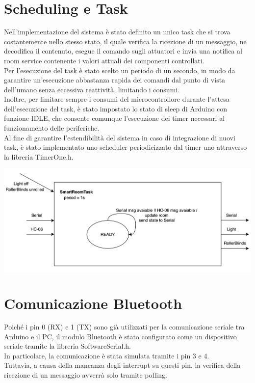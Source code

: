 \documentclass[a4paper]{report}
\begin{document}
\section{Scheduling e Task}
Nell'implementazione del sistema è stato definito un unico task che si trova costantemente nello
stesso stato, il quale verifica la ricezione di un messaggio, ne decodifica il contenuto, esegue il
comando sugli attuatori e invia una notifica al room service contenente i valori attuali dei
componenti controllati.\\
Per l'esecuzione del task è stato scelto un periodo di un secondo, in modo da garantire un'esecuzione abbastanza rapida dei comandi dal punto di vista dell'umano senza eccessiva reattività, limitando i consumi.\\
Inoltre, per limitare sempre i consumi del microcontrollore durante l'attesa dell'esecuzione del task, è stato impostato lo stato di sleep di Arduino con funzione IDLE, 
che consente comunque l'esecuzione dei timer necessari al funzionamento delle periferiche.\\
Al fine di garantire l'estendibilità del sistema in caso di integrazione di nuovi task, è stato implementato uno scheduler periodicizzato dal timer uno attraverso la libreria TimerOne.h.

\vspace{4cm}

\begin{center}
   \includegraphics[scale=0.5]{images/ArduinoStateDiagram.png}
\end{center}

\newpage

\section{Comunicazione Bluetooth}
Poiché i pin 0 (RX) e 1 (TX) sono già utilizzati per la comunicazione seriale tra Arduino e il PC, il modulo Bluetooth è stato configurato come un dispositivo seriale tramite la libreria SoftwareSerial.h.\\
In particolare, la comunicazione è stata simulata tramite i pin 3 e 4.\\
Tuttavia, a causa della mancanza degli interrupt su questi pin, la verifica della ricezione di un messaggio avverrà solo tramite polling.
\end{document}
